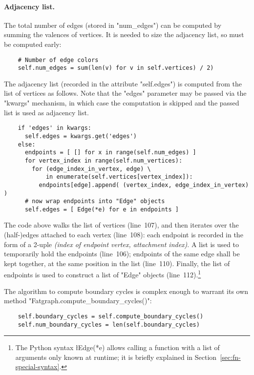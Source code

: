 \paragraph{Adjacency list.}
The total number of edges (stored in "num_edges") can be computed by
summing the valences of vertices.  It is needed to size the adjacency
list, so must be computed early:
\begin{lstlisting}
    # Number of edge colors
    self.num_edges = sum(len(v) for v in self.vertices) / 2)

\end{lstlisting}
The adjacency list (recorded in the attribute "self.edges") is computed
from the list of vertices as follows.  Note that the "edges" parameter
may be passed via the "kwargs" mechanism, in which case the
computation is skipped and the passed list is used as adjacency list.
\begin{lstlisting}
    if 'edges' in kwargs:
      self.edges = kwargs.get('edges')
    else:
      endpoints = [ [] for x in range(self.num_edges) ]
      for vertex_index in range(self.num_vertices):
        for (edge_index_in_vertex, edge) \
            in enumerate(self.vertices[vertex_index]):
          endpoints[edge].append( (vertex_index, edge_index_in_vertex) )
      # now wrap endpoints into "Edge" objects
      self.edges = [ Edge(*e) for e in endpoints ]

\end{lstlisting}
The code above walks the list of vertices (line~107), and then
iterates over the (half-)edges attached to each vertex (line~108):
each endpoint is recorded in the form of a 2-uple \emph{(index of
  endpoint vertex, attachment index)}. A list is used to temporarily
hold the endpoints (line~106); endpoints of the same edge shall be
kept together, at the same position in the list (line~110). Finally,
the list of endpoints is used to construct a list of "Edge" objects
(line~112).\footnote{The Python syntax \l{Edge(*e)} allows calling a
  function with a list of arguments only known at runtime; it is
  briefly explained in Section~\ref{sec:fn-special-syntax}.}

The algorithm to compute boundary cycles is complex enough to warrant
its own method "Fatgraph.compute_boundary_cycles()":
\begin{lstlisting}
    self.boundary_cycles = self.compute_boundary_cycles()
    self.num_boundary_cycles = len(self.boundary_cycles)

\end{lstlisting}

